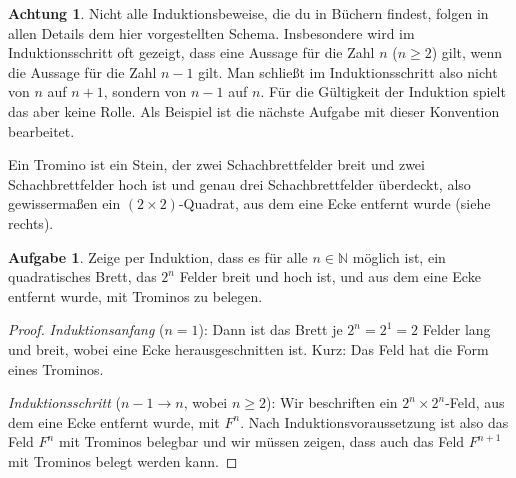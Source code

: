 \documentclass[a4paper,ngerman,12pt]{scrartcl}
\newcommand{\N}{\mathbb{N}}
\theoremstyle{definition}
\newtheorem*{aufg}{Aufgabe}
\newtheorem*{acht}{Achtung}
\begin{document}
\begin{shaded}
  \begin{acht}
    Nicht alle Induktionsbeweise, die du in Büchern findest, folgen in allen Details dem hier vorgestellten Schema. Insbesondere wird im Induktionsschritt oft gezeigt, dass eine Aussage für die Zahl $n$ ($n \geq 2$) gilt, wenn die Aussage für die Zahl $n{-}1$ gilt. Man schließt im Induktionsschritt also nicht von $n$ auf $n{+}1$, sondern von $n{-}1$ auf $n$. Für die Gültigkeit der Induktion spielt das aber keine Rolle. Als Beispiel ist die nächste Aufgabe mit dieser Konvention bearbeitet.
  \end{acht}
\end{shaded}

\begin{figure}
  \vspace{-30pt}
  \begin{center}
  \end{center}
  \vspace{-35pt}
\end{figure}

Ein Tromino ist ein Stein, der zwei Schachbrettfelder breit und zwei Schachbrettfelder hoch ist und genau drei Schachbrettfelder überdeckt, also gewissermaßen ein $(2 \times 2)$-Quadrat, aus dem eine Ecke entfernt wurde (siehe rechts). 

\begin{aufg}
  Zeige per Induktion, dass es für alle $n \in \N$ möglich ist, ein quadratisches Brett, das $2^n$ Felder breit und hoch ist, und aus dem eine Ecke entfernt wurde, mit Trominos zu belegen.
\end{aufg}

\begin{proof}
  \emph{Induktionsanfang} ($n=1$): Dann ist das Brett je $2^n = 2^1 = 2$ Felder lang und breit, wobei eine Ecke herausgeschnitten ist. Kurz: Das Feld hat die Form eines Trominos.

  \emph{Induktionsschritt} ($n{-}1 \to n$, wobei $n \geq 2$): Wir beschriften ein $2^n \times 2^n$-Feld, aus dem eine Ecke entfernt wurde, mit $F^n$. Nach Induktionsvoraussetzung ist also das Feld $F^n$ mit Trominos belegbar und wir müssen zeigen, dass auch das Feld $F^{n+1}$ mit Trominos belegt werden kann.
\end{proof}
\end{document}
